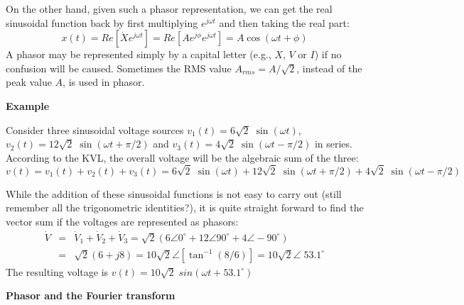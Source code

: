 \documentclass{article}
\begin{document}
On the other hand, given such a phasor representation, we can get the 
real sinusoidal function back by first multiplying $e^{j\omega t}$ and then
taking the real part:
\begin{equation}
  x(t)=Re[\dot{X} e^{j\omega t}]=Re[A e^{j\phi} e^{j\omega t}]=A\cos(\omega t+\phi)
\end{equation}
A phasor may be represented simply by a capital letter (e.g., $X$, 
$V$ or $I$) if no confusion will be caused. Sometimes the RMS value
$A_{rms}=A/\sqrt{2}$, instead of the peak value $A$, is used in phasor.


{\bf Example} 

Consider three sinusoidal voltage sources $v_1(t)=6\sqrt{2}\;\sin(\omega t)$,
$v_2(t)=12\sqrt{2}\;\sin(\omega t+\pi/2)$ and 
$v_3(t)=4\sqrt{2}\;\sin(\omega t-\pi/2)$ in series. According to the KVL, the 
overall voltage will be the algebraic sum of the three:
\begin{equation}
  v(t)=v_1(t)+v_2(t)+v_3(t)
  =6\sqrt{2}\;\sin(\omega t)+12\sqrt{2}\;\sin(\omega t+\pi/2)
  +4\sqrt{2}\;\sin(\omega t-\pi/2)	
\end{equation}


While the addition of these sinusoidal functions is not easy to carry out
(still remember all the trigonometric identities?), it is quite straight 
forward to find the vector sum if the voltages are represented as phasors:
\begin{eqnarray}
  \dot{V}&=&\dot{V}_1+\dot{V}_2+\dot{V}_3
  =\sqrt{2}(6\angle 0^\circ+12\angle 90^\circ+4\angle -90^\circ)
  \nonumber \\
  &=&\sqrt{2}(6+j8)=10\sqrt{2} \angle \left[\tan^{-1}(8/6)\right]
  =10\sqrt{2}\angle\; 53.1^\circ	
\end{eqnarray}
The resulting voltage is $v(t)=10\sqrt{2}\;sin(\omega t+53.1^\circ)$




{\bf Phasor and the Fourier transform}
\end{document}

